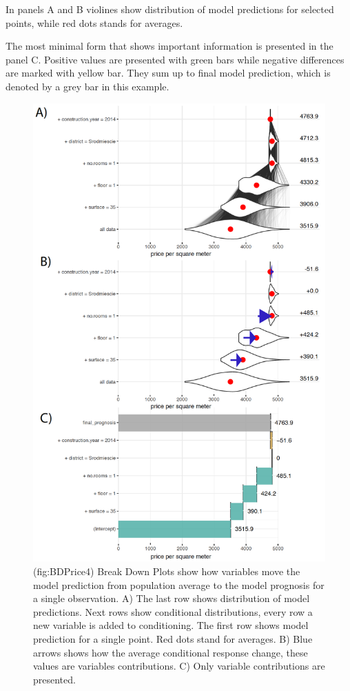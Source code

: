 \documentclass[]{krantz}
\theoremstyle{definition}
\theoremstyle{definition}
\theoremstyle{definition}
\theoremstyle{remark}
\begin{document}
In panels A and B violines show distribution of model predictions for
selected points, while red dots stands for averages.

The most minimal form that shows important information is presented in
the panel C. Positive values are presented with green bars while
negative differences are marked with yellow bar. They sum up to final
model prediction, which is denoted by a grey bar in this example.

\begin{figure}

{\centering \includegraphics[width=0.7\linewidth]{figure/bd_price_4} 

}

\caption{(fig:BDPrice4) Break Down Plots show how variables move the model prediction from population average to the model prognosis for a single observation. A) The last row shows distribution of model predictions. Next rows show conditional distributions, every row a new variable is added to conditioning. The first row shows model prediction for a single point. Red dots stand for averages. B) Blue arrows shows how the average conditional response change, these values are variables contributions. C) Only variable contributions are presented. }\label{fig:BDPrice4}
\end{figure}
\end{document}

